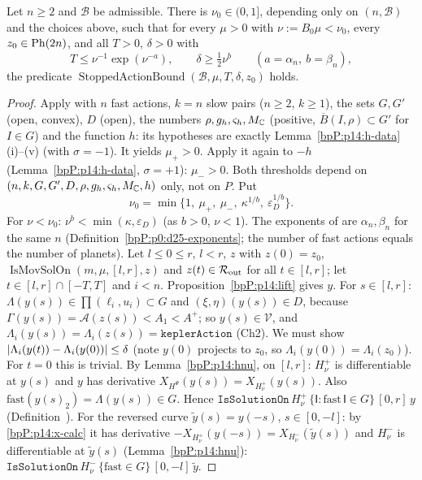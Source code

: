 \begin{proposition}\label{bpP:p14:stopped}
Let $n\ge2$ and $\mathcal B$ be admissible. There is $\nu_0\in(0,1]$, depending only on $(n,\mathcal B)$ and the choices above, such that for every $\mu>0$ with $\nu:=B_0\mu<\nu_0$, every $z_0\in\mathrm{Ph}(2n)$, and all $T>0$, $\delta>0$ with
\[T\le\nu^{-1}\exp(\nu^{-a}),\qquad\delta\ge\tfrac12\nu^{b}\qquad(a=\alpha_n,\ b=\beta_n),\]
the predicate $\operatorname{StoppedActionBound}(\mathcal B,\mu,T,\delta,z_0)$ holds.
\end{proposition}
\begin{proof}
\label{stepP:p14:st-thr} Apply  with $n$ fast actions, $k=n$ slow pairs ($n\ge2$, $k\ge1$), the sets $G,G'$ (open, convex), $D$ (open), the numbers $\rho,g_h,\varsigma_h,M_{\mathbb{C}}$ (positive, $\overline B(I,\rho)\subset G'$ for $I\in G$) and the function $h$: its hypotheses are exactly Lemma~\ref{bpP:p14:h-data} (i)--(v) (with $\sigma=-1$). It yields $\mu_+>0$. Apply it again to $-h$ (Lemma~\ref{bpP:p14:h-data}, $\sigma=+1$): $\mu_->0$. Both thresholds depend on $(n,k,G,G',D,\rho,g_h,\varsigma_h,M_{\mathbb{C}},h)$ only, not on $P$. Put
\[\nu_0=\min\{1,\ \mu_+,\ \mu_-,\ \kappa^{1/b},\ \varepsilon_D^{1/b}\}.\]
For $\nu<\nu_0$: $\nu^b<\min(\kappa,\varepsilon_D)$ (as $b>0$, $\nu<1$). The exponents of  are $\alpha_n,\beta_n$ for the same $n$ (Definition~\ref{bpP:p0:d25-exponents}; the number of fast actions equals the number of planets).
\label{stepP:p14:st-seg} Let $l\le0\le r$, $l<r$, $z$ with $z(0)=z_0$, $\operatorname{IsMovSolOn}(m,\mu,[l,r],z)$ and $z(t)\in\mathcal R_{\rm out}$ for all $t\in[l,r]$; let $t\in[l,r]\cap[-T,T]$ and $i<n$. Proposition~\ref{bpP:p14:lift} gives $y$. For $s\in[l,r]$: $\Lambda(y(s))\in\prod(\ell_i,u_i)\subset G$ and $(\xi,\eta)(y(s))\in D$, because $\Gamma(y(s))=\mathcal A(z(s))<A_1<A^+$; so $y(s)\in\mathcal V$, and $\Lambda_i(y(s))=\Lambda_i(z(s))=\texttt{keplerAction}$ (Ch2). We must show $\lvert \Lambda_i(y(t))-\Lambda_i(y(0))\rvert\le\delta$ (note $y(0)$ projects to $z_0$, so $\Lambda_i(y(0))=\Lambda_i(z_0)$). For $t=0$ this is trivial.
\label{stepP:p14:st-sol} By Lemma~\ref{bpP:p14:hnu}, on $[l,r]$: $H^+_\nu$ is differentiable at $y(s)$ and $y$ has derivative $X_{H^\Psi}(y(s))=X_{H^+_\nu}(y(s))$. Also $\mathrm{fast}(y(s)_2)=\Lambda(y(s))\in G$. Hence $\texttt{IsSolutionOn}\,H^+_\nu\,\{\mathsf I:\mathrm{fast}\,\mathsf I\in G\}\,[0,r]\,y$ (Definition~). For the reversed curve $\tilde y(s)=y(-s)$, $s\in[0,-l]$: by \ref{bpP:p14:x-calc} it has derivative $-X_{H^+_\nu}(y(-s))=X_{H^-_\nu}(\tilde y(s))$ and $H_\nu^-$ is differentiable at $\tilde y(s)$ (Lemma~\ref{bpP:p14:hnu}): $\texttt{IsSolutionOn}\,H^-_\nu\,\{\mathrm{fast}\in G\}\,[0,-l]\,\tilde y$.

\end{proof}
